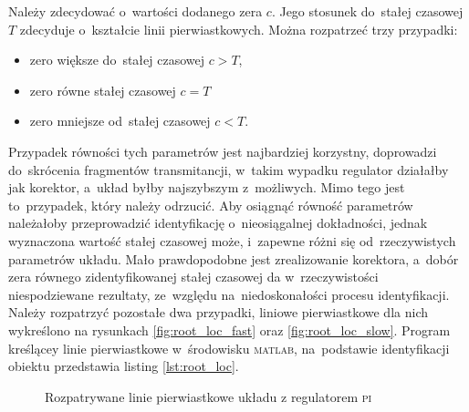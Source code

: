 \documentclass[11pt]{article}
\begin{document}
Należy zdecydować o~wartości dodanego zera $ c $. Jego stosunek do~stałej czasowej $ T $ zdecyduje o~kształcie linii pierwiastkowych.
Można rozpatrzeć trzy przypadki:
\begin{itemize}
	\item zero większe do~stałej czasowej $ c > T $,
	\item zero równe stałej czasowej $ c = T $
	\item zero mniejsze od~stałej czasowej $ c < T $.
\end{itemize}
Przypadek równości tych parametrów jest najbardziej korzystny, doprowadzi do~skrócenia fragmentów transmitancji, w~takim wypadku regulator działałby jak korektor, a~układ byłby najszybszym z~możliwych.
Mimo tego jest to~przypadek, który należy odrzucić.
Aby osiągnąć równość parametrów należałoby przeprowadzić identyfikację o~nieosiągalnej dokładności, jednak wyznaczona wartość stałej czasowej może, i~zapewne różni się od~rzeczywistych parametrów układu.
Mało prawdopodobne jest zrealizowanie korektora, a~dobór zera równego zidentyfikowanej stałej czasowej da w~rzeczywistości niespodziewane rezultaty, ze~względu na~niedoskonałości procesu identyfikacji.
Należy rozpatrzyć pozostałe dwa przypadki, liniowe pierwiastkowe dla nich wykreślono na rysunkach \ref{fig:root_loc_fast} oraz \ref{fig:root_loc_slow}. Program kreślącey linie pierwiastkowe w~środowisku \textsc{matlab}, na~podstawie identyfikacji obiektu przedstawia listing \ref{lst:root_loc}.

\begin{figure}[!htbp] 
	\quad 
	\caption{Rozpatrywane linie pierwiastkowe układu z regulatorem \textsc{pi}} 
\end{figure}
\end{document}
